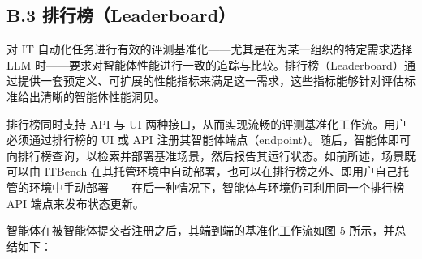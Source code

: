 \subsection{B.3 排行榜（Leaderboard）}

对 IT 自动化任务进行有效的评测基准化——尤其是在为某一组织的特定需求选择 LLM 时——要求对智能体性能进行一致的追踪与比较。排行榜（Leaderboard）通过提供一套预定义、可扩展的性能指标来满足这一需求，这些指标能够针对评估标准给出清晰的智能体性能洞见。

排行榜同时支持 API 与 UI 两种接口，从而实现流畅的评测基准化工作流。用户必须通过排行榜的 UI 或 API 注册其智能体端点（endpoint）。随后，智能体即可向排行榜查询，以检索并部署基准场景，然后报告其运行状态。如前所述，场景既可以由 ITBench 在其托管环境中自动部署，也可以在排行榜之外、即用户自己托管的环境中手动部署——在后一种情况下，智能体与环境仍可利用同一个排行榜 API 端点来发布状态更新。

智能体在被智能体提交者注册之后，其端到端的基准化工作流如图 5 所示，并总结如下：

